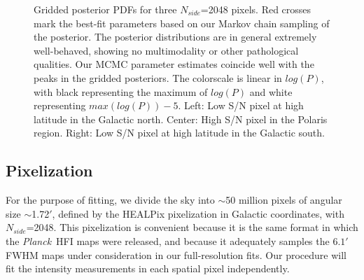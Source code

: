 \documentclass{emulateapj}
\newcommand{\PLANCK}{{\it Planck}}
\begin{document}

\begin{figure*}
\begin{center}
\caption{Gridded posterior PDFs for three $N_{side}$=2048 pixels. Red crosses 
mark the best-fit parameters based on our Markov chain sampling of the 
posterior. The posterior distributions are in general extremely well-behaved, 
showing no multimodality or other pathological qualities. Our MCMC parameter 
estimates coincide well with the peaks in the gridded posteriors. The 
colorscale is linear in $log(P)$, with black representing the maximum of 
$log(P)$ and white representing $max(log(P))-5$. Left: Low S/N pixel at 
high latitude in the Galactic north. Center: High S/N pixel in the Polaris 
region. Right: Low S/N pixel at high latitude in the Galactic south.}
\end{center}
\end{figure*}


\subsection{Pixelization}
\label{sec:pix}
For the purpose of fitting, we divide the sky into $\sim$50 million pixels of 
angular size $\sim$1.72$'$, defined by the HEALPix pixelization in Galactic 
coordinates, with $N_{side}$=2048. This pixelization is convenient because it 
is the same format in which the \PLANCK~HFI maps were released, and because it 
adequately samples the $6.1'$ FWHM maps under consideration in our 
full-resolution fits. Our procedure will fit the intensity measurements in each
spatial pixel independently.
\end{document}

